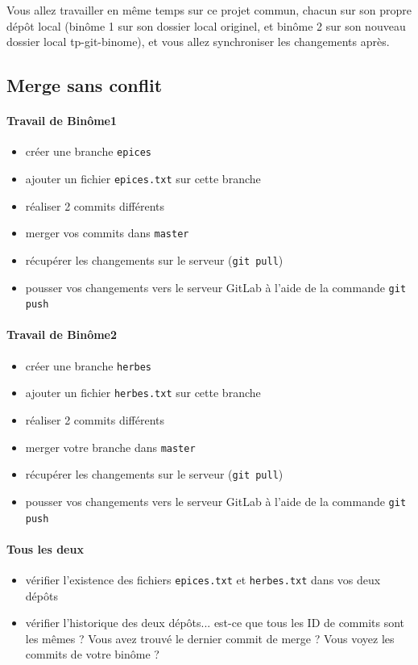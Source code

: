 \documentclass[final, a4paper, openbib, ]{article}
\begin{document}
Vous allez travailler en même temps sur ce projet commun, chacun sur son propre dépôt local (binôme 1 sur son dossier local originel, et binôme 2 sur son nouveau dossier local tp-git-binome), et vous allez synchroniser les changements après.

\subsection{Merge sans conflit}

\paragraph{Travail de Binôme1}
\begin{itemize}
\item créer une branche \texttt{epices}
\item ajouter un fichier \texttt{epices.txt} sur cette branche
\item réaliser 2 commits différents
\item merger vos commits dans \texttt{master}
\item récupérer les changements sur le serveur (\texttt{git pull})
\item pousser vos changements vers le serveur GitLab à l'aide de la commande \texttt{git push}
\end{itemize}

\paragraph{Travail de Binôme2}
\begin{itemize}
\item créer une branche \texttt{herbes}
\item ajouter un fichier \texttt{herbes.txt} sur cette branche
\item réaliser 2 commits différents
\item merger votre branche dans \texttt{master}
\item récupérer les changements sur le serveur (\texttt{git pull})
\item pousser vos changements vers le serveur GitLab à l'aide de la commande \texttt{git push}\\
\end{itemize}

\paragraph{Tous les deux}
\begin{itemize}
\item vérifier l'existence des fichiers \texttt{epices.txt} et \texttt{herbes.txt} dans vos deux dépôts
\item vérifier l'historique des deux dépôts... est-ce que tous les ID de commits sont les mêmes ? Vous avez trouvé le dernier commit de merge ? Vous voyez les commits de votre binôme ?\\
\end{itemize}
\end{document}
